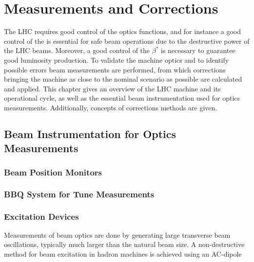 
\section{Measurements and Corrections}
\label{section:measurements_and_corrections}

The LHC requires good control of the optics functions, and for instance a good control of the \betafunctions is essential for safe beam operations due to the destructive power of the LHC beams.
Moreover, a good control of the \(\beta^{\ast}\) is necessary to guarantee good luminosity production.
To validate the machine optics and to identify possible errors beam measurements are performed, from which corrections bringing the machine as close to the nominal scenario as possible are calculated and applied. 
This chapter gives an overview of the LHC machine and its operational cycle, as well as the essential beam instrumentation used for optics measurements.
Additionally, concepts of corrections methods are given.

\subsection{Beam Instrumentation for Optics Measurements}

\subsubsection{Beam Position Monitors}


\subsubsection{BBQ System for Tune Measurements}

\subsubsection{Excitation Devices}


Measurements of beam optics are done by generating large transverse beam oscillations, typically much larger than the natural beam size.
A non-destructive method for beam excitation in hadron machines is achieved using an AC-dipole

